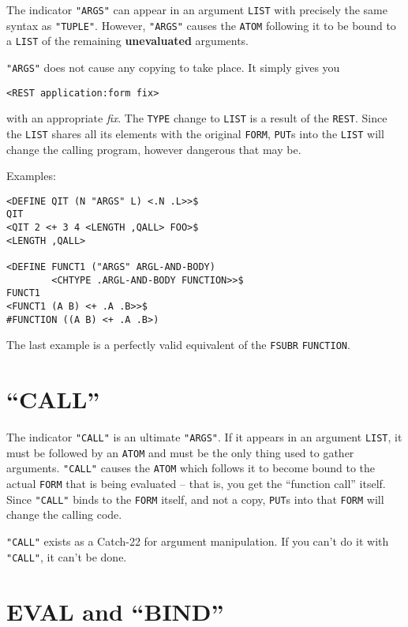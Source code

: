\documentclass[a4paper]{scrbook}
\begin{document}
The indicator \texttt{"ARGS"}  can appear in an argument \texttt{LIST} with precisely the
same syntax as \texttt{"TUPLE"}. However, \texttt{"ARGS"} causes the \texttt{ATOM} following it to be bound to a
\texttt{LIST} of the remaining \textbf{unevaluated} arguments.

\texttt{"ARGS"} does not cause any copying to take place. It simply gives you

\begin{verbatim}
<REST application:form fix>
\end{verbatim}

with an appropriate \emph{fix}. The \texttt{TYPE} change to \texttt{LIST} is a result of the \texttt{REST}. Since the
\texttt{LIST} shares all its elements with the original \texttt{FORM}, \texttt{PUT}s into the \texttt{LIST} will change the
calling program, however dangerous that may be.

Examples:

\begin{verbatim}
<DEFINE QIT (N "ARGS" L) <.N .L>>$
QIT
<QIT 2 <+ 3 4 <LENGTH ,QALL> FOO>$
<LENGTH ,QALL>

<DEFINE FUNCT1 ("ARGS" ARGL-AND-BODY)
        <CHTYPE .ARGL-AND-BODY FUNCTION>>$
FUNCT1
<FUNCT1 (A B) <+ .A .B>>$
#FUNCTION ((A B) <+ .A .B>)
\end{verbatim}

The last example is a perfectly valid equivalent of the \texttt{FSUBR} \texttt{FUNCTION}.

\section{\texorpdfstring{``CALL''}{9.6. CALL}}\label{call}

The indicator \texttt{"CALL"}  is an ultimate \texttt{"ARGS"}. If it appears in an argument
\texttt{LIST}, it must be followed by an \texttt{ATOM} and must be the only thing used to gather arguments. \texttt{"CALL"}
causes the \texttt{ATOM} which follows it to become bound to the actual \texttt{FORM} that is being evaluated -- that is,
you get the ``function call'' itself. Since \texttt{"CALL"} binds to the \texttt{FORM} itself, and not a copy,
\texttt{PUT}s into that \texttt{FORM} will change the calling code.

\texttt{"CALL"} exists as a Catch-22 for argument manipulation. If you can't do it with \texttt{"CALL"}, it can't be done.

\section{\texorpdfstring{EVAL and ``BIND''}{9.7. EVAL and BIND}}\label{eval-and-bind}
\end{document}
